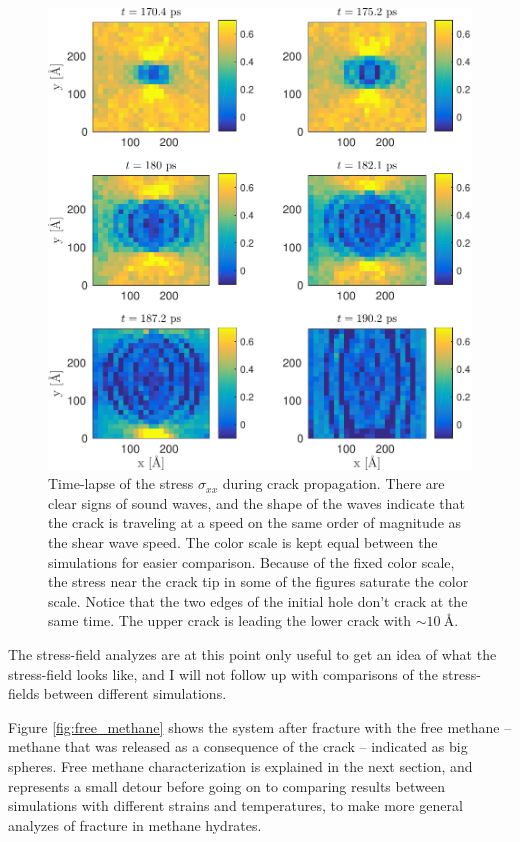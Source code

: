 \begin{figure}
\includegraphics[width=\textwidth]{../figures/thesis/stressfield_timelapse.pdf}
\caption{Time-lapse of the stress $\sigma_{xx}$ during crack propagation. There are clear signs of sound waves, and the shape of the waves indicate that the crack is traveling at a speed on the same order of magnitude as the shear wave speed. The color scale is kept equal between the simulations for easier comparison. Because of the fixed color scale, the stress near the crack tip in some of the figures saturate the color scale. Notice that the two edges of the initial hole don't crack at the same time. The upper crack is leading the lower crack 
with $\sim \SI{10}{\angstrom}$. }
\label{fig:stressfield_timelapse}
\end{figure}

The stress-field analyzes are at this point only useful to get an idea of what the stress-field looks like, and I will not follow up with comparisons of the stress-fields between different simulations. 

Figure \ref{fig:free_methane} shows the system after fracture with the free methane -- methane that was released as a consequence of the crack -- indicated as big spheres. Free methane characterization is explained in the next section, and represents a small detour before going on to comparing results between simulations with different strains and temperatures, to make more general analyzes of fracture in methane hydrates.

